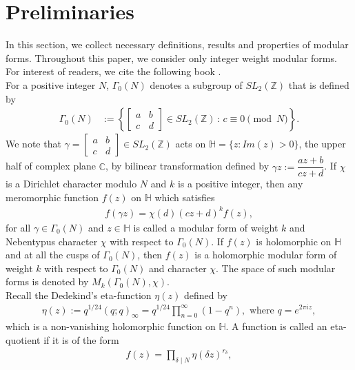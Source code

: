 \documentclass[11pt,a4paper]{article}
\numberwithin{equation}{section}
\theoremstyle{plain}
\begin{document}
\section{Preliminaries}\label{s2}
	In this section, we collect necessary definitions, results and properties of modular forms. Throughout this paper, we consider only integer weight modular forms. For interest of readers, we cite the following book \cite{wom}.\\
\indent  For a positive integer $N$, $\Gamma_0(N)$ denotes a subgroup of $SL_2(\mathbb{Z})$ that is defined by
\begin{align*}
	\Gamma_0(N)&:= 
	\left\{
	\begin{bmatrix}
		a & b \\
		c & d
	\end{bmatrix} \in SL_2(\mathbb{Z})
	\,:\, c \equiv 0\!\!\!\! \pmod N 
	\right\}.
\end{align*}
We note that $\gamma=\begin{bmatrix}
	a & b \\
	c & d
\end{bmatrix}\in SL_2(\mathbb{Z})$ acts on $\mathbb{H}=\{z: Im(z)>0\}$, the upper half of complex plane $\mathbb{C}$, by bilinear transformation defined by $\gamma z:=\dfrac{az
	+b}{cz+d} $. If $\chi$ is a Dirichlet character modulo $N$ and $k$ is a positive integer, then any meromorphic function $f(z)$ on $\mathbb{H}$ which satisfies
	\begin{align*}
		f(\gamma z)=\chi(d)(cz+d)^kf(z),
	\end{align*} 
	for all $\gamma\in\Gamma_0(N)$ and $z\in\mathbb{H}$ is called a modular form of weight $k$ and Nebentypus character $\chi$ with respect to $\Gamma_0(N)$. If $f(z)$ is holomorphic on $\mathbb{H}$ and at all the cusps of $\Gamma_0(N)$, then $f(z)$ is a holomorphic modular form of weight $k$ with respect to $\Gamma_0(N)$ and character $\chi$. The space of such modular forms is denoted by $M_k(\Gamma_0(N), \chi)$.\\
\indent Recall the Dedekind's eta-function $\eta(z)$ defined by
\begin{align}\label{2.1}
	\eta(z):=q^{1/24}(q;q)_\infty=q^{1/24}\prod_{n=0}^\infty(1-q^{n}), \text{ where } q=e^{2\pi iz},
\end{align}
which is a non-vanishing holomorphic function on $\mathbb{H}$. A function is called an eta-quotient if it is of the form
\begin{align}
f(z)=\prod_{\delta\mid N}\eta(\delta z)^{r_\delta},
\end{align}
\end{document}
